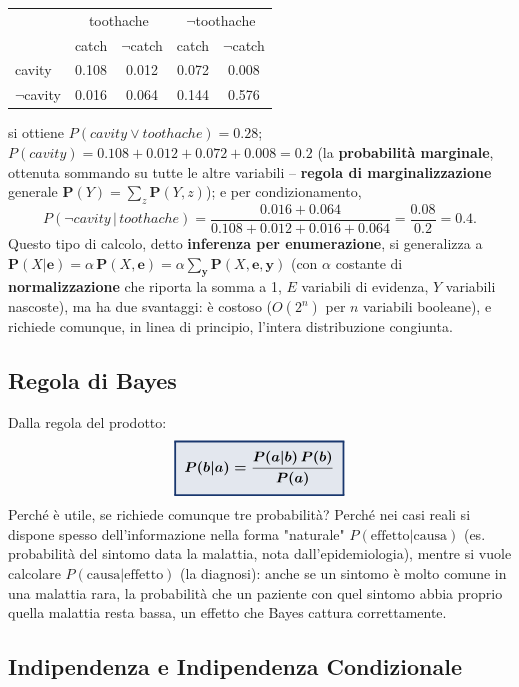 \documentclass[a4paper,11pt]{article}
\newcommand{\keyeq}[1]{{\setlength{\fboxsep}{6pt}\setlength{\fboxrule}{1.3pt}\fcolorbox{iablue}{iablue!12}{\boldmath$\displaystyle #1$}}}
\begin{document}
\begin{center}
\small
\begin{tabular}{lcccc}
\toprule
 & \multicolumn{2}{c}{toothache} & \multicolumn{2}{c}{$\neg$toothache} \\
 & catch & $\neg$catch & catch & $\neg$catch \\
\midrule
cavity & 0.108 & 0.012 & 0.072 & 0.008 \\
$\neg$cavity & 0.016 & 0.064 & 0.144 & 0.576 \\
\bottomrule
\end{tabular}
\end{center}
si ottiene $P(cavity\vee toothache)=0.28$; $P(cavity)=0.108{+}0.012{+}0.072{+}0.008=0.2$ (la \textbf{probabilità marginale}, ottenuta sommando su tutte le altre variabili -- \textbf{regola di marginalizzazione} generale $\mathbf{P}(Y)=\sum_z\mathbf{P}(Y,z)$); e per condizionamento,
\[
P(\neg cavity\,|\,toothache) = \frac{0.016+0.064}{0.108+0.012+0.016+0.064} = \frac{0.08}{0.2} = 0.4.
\]
Questo tipo di calcolo, detto \textbf{inferenza per enumerazione}, si generalizza a $\mathbf{P}(X|\mathbf{e})=\alpha\,\mathbf{P}(X,\mathbf{e})=\alpha\sum_{\mathbf{y}}\mathbf{P}(X,\mathbf{e},\mathbf{y})$ (con $\alpha$ costante di \textbf{normalizzazione} che riporta la somma a 1, $E$ variabili di evidenza, $Y$ variabili nascoste), ma ha due svantaggi: è costoso ($O(2^n)$ per $n$ variabili booleane), e richiede comunque, in linea di principio, l'intera distribuzione congiunta.

\subsection{Regola di Bayes}

Dalla regola del prodotto:
\[
\keyeq{P(b|a) = \frac{P(a|b)\,P(b)}{P(a)}}
\]
Perché è utile, se richiede comunque tre probabilità? Perché nei casi reali si dispone spesso dell'informazione nella forma "naturale" $P(\text{effetto}|\text{causa})$ (es. probabilità del sintomo data la malattia, nota dall'epidemiologia), mentre si vuole calcolare $P(\text{causa}|\text{effetto})$ (la diagnosi): anche se un sintomo è molto comune in una malattia rara, la probabilità che un paziente con quel sintomo abbia proprio quella malattia resta bassa, un effetto che Bayes cattura correttamente.

\subsection{Indipendenza e Indipendenza Condizionale}
\end{document}
